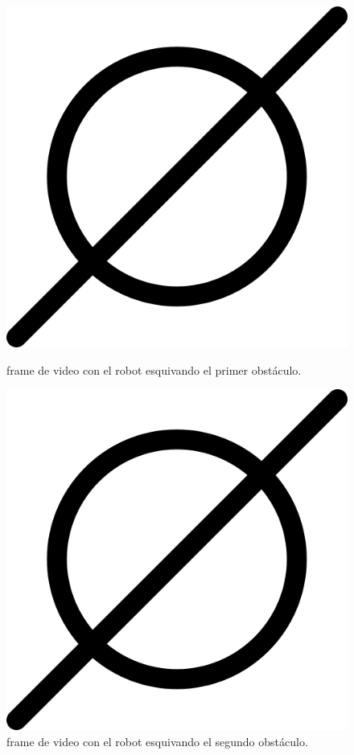 \begin{figure}[htbp]
  \centering
  \begin{minipage}[b]{0.45\textwidth}
    \centering
    \includegraphics[width=\textwidth]{images/poner_foto.png}
    \caption{frame de video con el robot esquivando el primer obstáculo.}
    \label{fig:frame1_dinamica}
  \end{minipage}
  \hfill
  \begin{minipage}[b]{0.45\textwidth}
    \centering
    \includegraphics[width=\textwidth]{images/poner_foto.png}
    \caption{frame de video con el robot esquivando el segundo obstáculo.}
    \label{fig:frame2_dinamica}
  \end{minipage}
\end{figure}

